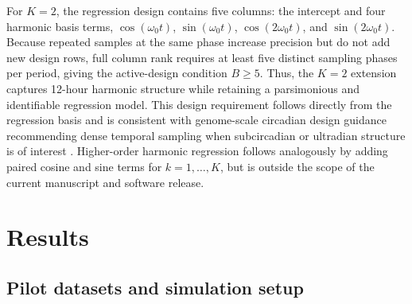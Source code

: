 \documentclass{article}
\begin{document}
For $K=2$, the regression design contains five columns: the intercept and
four harmonic basis terms,
$\cos(\omega_0 t)$, $\sin(\omega_0 t)$, $\cos(2\omega_0 t)$, and
$\sin(2\omega_0 t)$. Because repeated samples at the same phase increase
precision but do not add new design rows, full column rank requires at
least five distinct sampling phases per period, giving the active-design
condition $B \geq 5$. Thus, the $K=2$ extension captures 12-hour harmonic
structure while retaining a parsimonious and identifiable regression
model. This design requirement follows directly from the regression basis
and is consistent with genome-scale circadian design guidance recommending
dense temporal sampling when subcircadian or ultradian structure is of
interest \citep{Hughes2017guidelines}. Higher-order harmonic regression
follows analogously by adding paired cosine and sine terms for
$k=1,\ldots,K$, but is outside the scope of the current manuscript and
software release.
\section{Results}\label{sec:results}
\subsection{Pilot datasets and simulation setup}
\label{sec:pilot_datasets}
\end{document}
